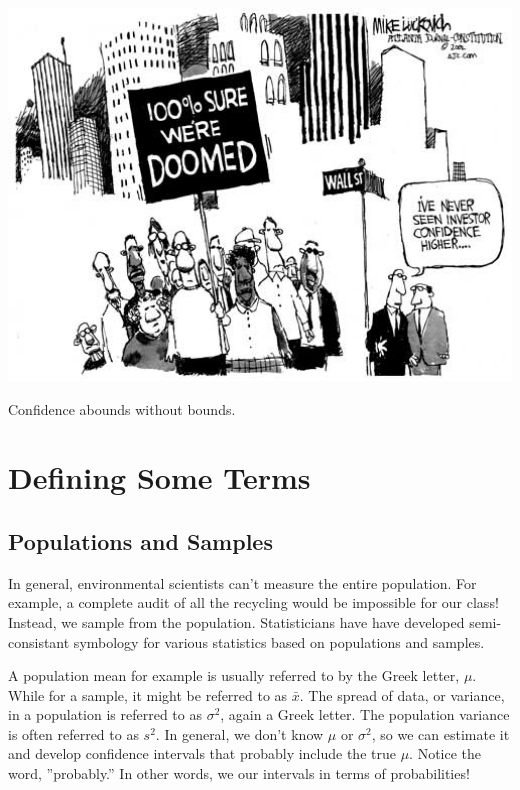 \documentclass{tufte-handout}\usepackage[]{graphicx}\usepackage[]{color}
\begin{document}
\begin{marginfigure}
	\centering
		\includegraphics[width=1.00\textwidth]{Investor_confidence500.jpg}
	\caption{Confidence abounds without bounds.}
	\label{fig:Investor_confidence500}
\end{marginfigure}

\section{Defining Some Terms}

\subsection{Populations and Samples}

In general, environmental scientists can't measure the entire population. For example, a complete audit of all the recycling would be impossible for our class!  Instead, we sample from the population. Statisticians have have developed semi-consistant symbology for various statistics based on populations and samples. 

A population mean for example is usually referred to by the Greek letter, $\mu$. While for a sample, it might be referred to as $\bar{x}$. The spread of data, or variance, in a population is referred to as $\sigma^2$, again a Greek letter. The population variance is often referred to as $s^2$. In general, we don't know $\mu$ or $\sigma^2$, so we can estimate it and develop confidence intervals that probably include the true $\mu$. Notice the word, ''probably.''  In other words, we our intervals in terms of probabilities!
\end{document}
